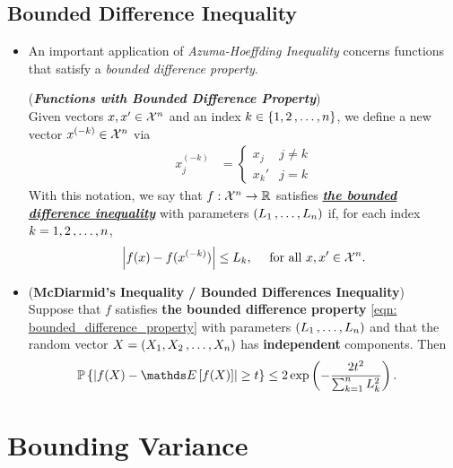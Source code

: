 \documentclass[11pt]{article}
\begin{document}
\subsection{Bounded Difference Inequality}
\begin{itemize}
\item An important application of \emph{Azuma-Hoeffding Inequality} concerns functions that satisfy a \emph{bounded difference property}. 
\begin{definition} (\textbf{\emph{Functions with Bounded Difference Property}})\\
Given vectors $x, x' \in {\mathcal X}^n$ and an index $k \in \left\{1, 2 \,{,}\ldots{,}\, n\right\}$, we define a new vector $x^{(-k)} \in {\mathcal X}^n$ via
\begin{align*}
x_j^{(-k)} &= \left\{\begin{array}{cc}
x_j & j \neq k\\
x_k'& j = k
\end{array}
\right.
\end{align*}
With this notation, we say that $f: {\mathcal X}^n \to {\mathbb R}$ satisfies \underline{\textbf{\emph{the bounded difference inequality}}} with parameters $(L_1 \,{,}\ldots{,}\, L_n)$ if, for each index $k = 1, 2 \,{,}\ldots{,}\, n$,
\begin{align}
\left\lvert f(x) - f(x^{(-k)}) \right\rvert \le L_k, \quad\text{ for all }x, x' \in {\mathcal X}^n. \label{eqn: bounded_difference_property}
\end{align}
\end{definition}


\item \begin{corollary} (\textbf{McDiarmid's Inequality / Bounded Differences Inequality})\citep{wainwright2019high}\\
Suppose that $f$ satisfies \textbf{the bounded difference property} \eqref{eqn: bounded_difference_property} with parameters $(L_1 \,{,}\ldots{,}\, L_n)$ and that the random vector $X = (X_1, X_2 \,{,}\ldots{,}\, X_n)$ has \textbf{independent} components. Then
\begin{align}
\bP\set{\abs{f(X) - \E{}{f(X)}} \ge t } &\le  2 \exp\paren{- \frac{2 t^2}{ \sum_{k=1}^{n}L_k^2}}. \label{ineqn: macdiarmid_bounded_difference_inequality}
\end{align}
\end{corollary}
\end{itemize}

\section{Bounding Variance}
\end{document}
